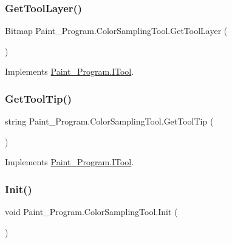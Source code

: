\subsubsection{\texorpdfstring{Get\+Tool\+Layer()}{GetToolLayer()}}
{\footnotesize\ttfamily Bitmap Paint\+\_\+\+Program.\+Color\+Sampling\+Tool.\+Get\+Tool\+Layer (\begin{DoxyParamCaption}{ }\end{DoxyParamCaption})\hspace{0.3cm}{\ttfamily [inline]}}



Implements \mbox{\hyperlink{interface_paint___program_1_1_i_tool_a9b057905515f42a988c166a6a40318e0}{Paint\+\_\+\+Program.\+I\+Tool}}.

\mbox{\label{class_paint___program_1_1_color_sampling_tool_a6d26407d4a5040f66c417c7ccaf75793}} 
\subsubsection{\texorpdfstring{Get\+Tool\+Tip()}{GetToolTip()}}
{\footnotesize\ttfamily string Paint\+\_\+\+Program.\+Color\+Sampling\+Tool.\+Get\+Tool\+Tip (\begin{DoxyParamCaption}{ }\end{DoxyParamCaption})\hspace{0.3cm}{\ttfamily [inline]}}



Implements \mbox{\hyperlink{interface_paint___program_1_1_i_tool_ac11f1591587144b6e74f5767bbf1df56}{Paint\+\_\+\+Program.\+I\+Tool}}.

\mbox{\label{class_paint___program_1_1_color_sampling_tool_ae6d5a44df3a4394f7da352d1170bea54}} 
\subsubsection{\texorpdfstring{Init()}{Init()}}
{\footnotesize\ttfamily void Paint\+\_\+\+Program.\+Color\+Sampling\+Tool.\+Init (\begin{DoxyParamCaption}{ }\end{DoxyParamCaption})\hspace{0.3cm}{\ttfamily [inline]}}



